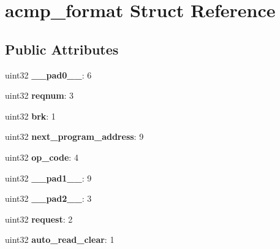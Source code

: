 \hypertarget{structacmp__format}{}\section{acmp\+\_\+format Struct Reference}
\label{structacmp__format}
\subsection*{Public Attributes}
\begin{DoxyCompactItemize}
\item 
\mbox{\label{structacmp__format_a6c8a3ecc761c7cd3f5fc7bd1dd144684}} 
uint32 {\bfseries \+\_\+\+\_\+pad0\+\_\+\+\_\+}\+: 6
\item 
\mbox{\label{structacmp__format_afcb784e2ac189a03a9e84fd8839a1fd3}} 
uint32 {\bfseries reqnum}\+: 3
\item 
\mbox{\label{structacmp__format_a7a163795b2f2290b380177fb9b51ae1c}} 
uint32 {\bfseries brk}\+: 1
\item 
\mbox{\label{structacmp__format_abf898ca09d0c8b9c99a15c8fdf5a9310}} 
uint32 {\bfseries next\+\_\+program\+\_\+address}\+: 9
\item 
\mbox{\label{structacmp__format_a94fccf2a0b0b93e289facfab72de6695}} 
uint32 {\bfseries op\+\_\+code}\+: 4
\item 
\mbox{\label{structacmp__format_ab883b07976720ed65ec4f0847593eac7}} 
uint32 {\bfseries \+\_\+\+\_\+pad1\+\_\+\+\_\+}\+: 9
\item 
\mbox{\label{structacmp__format_ab3617b04e1fd676e8e1c77f55497bc13}} 
uint32 {\bfseries \+\_\+\+\_\+pad2\+\_\+\+\_\+}\+: 3
\item 
\mbox{\label{structacmp__format_af3f475071aa21b1f2ecf1b42674e8a54}} 
uint32 {\bfseries request}\+: 2
\item 
\mbox{\label{structacmp__format_a3e66a5ebb69d1ec05cfa65285206b178}} 
uint32 {\bfseries auto\+\_\+read\+\_\+clear}\+: 1
\item 

\end{DoxyCompactItemize}
